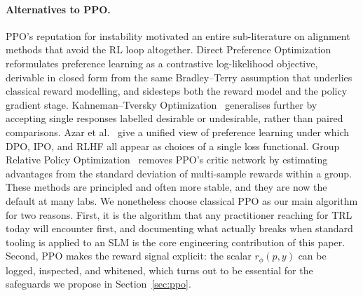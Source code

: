 \documentclass[10pt,twocolumn,letterpaper]{article}
\begin{document}
\paragraph{Alternatives to PPO.}
PPO's reputation for instability motivated an entire sub-literature on alignment methods that avoid the RL loop altogether. Direct Preference Optimization~\cite{rafailov2023direct} reformulates preference learning as a contrastive log-likelihood objective, derivable in closed form from the same Bradley--Terry assumption that underlies classical reward modelling, and sidesteps both the reward model and the policy gradient stage. Kahneman--Tversky Optimization~\cite{ethayarajh2024kto} generalises further by accepting single responses labelled desirable or undesirable, rather than paired comparisons. Azar et al.~\cite{azar2023general} give a unified view of preference learning under which DPO, IPO, and RLHF all appear as choices of a single loss functional. Group Relative Policy Optimization~\cite{shao2024deepseekmath} removes PPO's critic network by estimating advantages from the standard deviation of multi-sample rewards within a group. These methods are principled and often more stable, and they are now the default at many labs. We nonetheless choose classical PPO as our main algorithm for two reasons. First, it is the algorithm that any practitioner reaching for TRL today will encounter first, and documenting what actually breaks when standard tooling is applied to an SLM is the core engineering contribution of this paper. Second, PPO makes the reward signal explicit: the scalar $r_\phi(p,y)$ can be logged, inspected, and whitened, which turns out to be essential for the safeguards we propose in Section~\ref{sec:ppo}.
\end{document}
